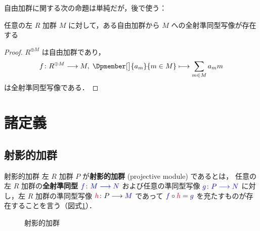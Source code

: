 \documentclass[algtopo_main]{subfiles}
\begin{document}
自由加群に関する次の命題は単純だが，後で使う：

\begin{myprop}[label=prop:free-mod-surjection]{}
    任意の左 $R$ 加群 $M$ に対して，ある自由加群から $M$ への全射準同型写像が存在する
\end{myprop}

\begin{proof}
    $R^{\oplus M}$ は自由加群であり，
    \begin{align}
        f \colon R^{\oplus M} \lto M,\; \Dpmember[\big]{a_m}{m \in M} \lmto \sum_{m \in M} a_m m
    \end{align}
    は全射準同型写像である．
\end{proof}


\section{諸定義}

\subsection{射影的加群}

\begin{mydef}[label=def:proj-mod]{射影的加群}
    左 $R$ 加群 $P$ が\textbf{射影的加群} (projective module) であるとは，
    任意の左 $R$ 加群の\textbf{全射準同型} $\textcolor{blue}{f\colon M \longrightarrow N}$ および任意の準同型写像 $\textcolor{blue}{g \colon P \longrightarrow N}$ に対し，左 $R$ 加群の準同型写像 $ \textcolor{red}{h} \colon P \longrightarrow \textcolor{blue}{M}$ であって $\textcolor{blue}{f} \circ \textcolor{red}{h} = \textcolor{blue}{g}$ を充たすものが存在することを言う（図式\ref{fig:proj-mod}）．
\end{mydef}

\begin{figure}[H]
    \centering
    \caption{射影的加群}
    \label{fig:proj-mod}
\end{figure}%
\end{document}
